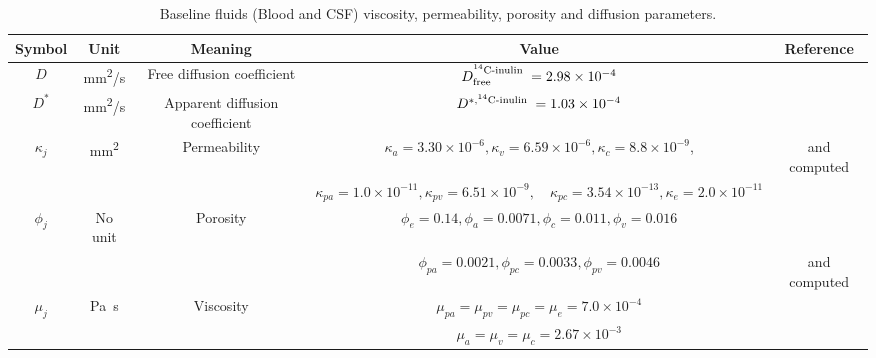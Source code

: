 \documentclass[a4paper,11pt]{article} %
\newcommand{\1}{^{(1)}}
\newcommand{\2}{^{(2)}}
\newcommand{\Cinulin}{$\prescript{14}{}{\text{C}}$-inulin }
\providecommand{\DIFdelbegin}{} %
\providecommand{\DIFaddendFL}{} %
\newcommand{\DIFscaledelfig}{0.5}
\newlength{\DIFdelgraphicswidth} %
\newlength{\DIFdelgraphicsheight} %
\newcommand{\DIFdelincludegraphics}[2][]{%
\sbox{\DIFdelgraphicsbox}{\DIFOincludegraphics[#1]{#2}}%
\settoboxwidth{\DIFdelgraphicswidth}{\DIFdelgraphicsbox} %
\settoboxtotalheight{\DIFdelgraphicsheight}{\DIFdelgraphicsbox} %
\scalebox{\DIFscaledelfig}{%
\parbox[b]{\DIFdelgraphicswidth}{\usebox{\DIFdelgraphicsbox}\\[-\baselineskip] \rule{\DIFdelgraphicswidth}{0em}}\llap{\resizebox{\DIFdelgraphicswidth}{\DIFdelgraphicsheight}{%
\setlength{\unitlength}{\DIFdelgraphicswidth}%
\begin{picture}(1,1)%
\thicklines\linethickness{2pt} %
{\color[rgb]{1,0,0}\put(0,0){\framebox(1,1){}}}%
{\color[rgb]{1,0,0}\put(0,0){\line( 1,1){1}}}%
{\color[rgb]{1,0,0}\put(0,1){\line(1,-1){1}}}%
\end{picture}%
}\hspace*{3pt}}} %
} %
\DeclareRobustCommand{\DIFdelbegin}{\DIFOdelbegin \let\includegraphics\DIFdelincludegraphics} %
\DeclareRobustCommand{\DIFaddendFL}{\DIFOaddendFL \let\includegraphics\DIFOincludegraphics} %
\begin{document}
\begin{table}[h]
{    \begin{tabular}{c|c|c|c|c}
          Symbol & Unit & Meaning & Value & Reference \\
         \hline 
         $D$ & \si{mm^2/\second} & Free diffusion coefficient & $ D_\text{free}^\text{\Cinulin} = 2.98 \times 10^{-4}$ & \cite{lanman1971diffusion} \\
         $ D^*$ & \si{mm^2/\second} & Apparent diffusion coefficient &  $D^{*,\text{\Cinulin}} = 1.03\times 10^{-4} $& \cite{lanman1971diffusion} \\
         $\kappa_{j}$ & \si{mm^2} & Permeability &  $\kappa_{a} = 3.30 \times 10^{-6}, \kappa_v = 6.59\times 10^{-6} , \kappa_{c}  =8.8\times 10^{-9}$, & \cite{Holter9894} and computed\\
    &&&$\kappa_{pa} =  1.0\times 10^{-11}, \kappa_{pv} = 6.51\times 10^{-9},\quad \kappa_{pc}  = 3.54 \times 10^{-13}, \kappa_e = 2.0\times 10^{-11} $ & \\
         $\phi_j$ & No unit & Porosity & $    \phi_e = 0.14, \phi_a = 0.0071,  \phi_c = 0.011, \phi_v = 0.016$ & \cite{Cserr-1991-Extracellular,Adriana-2007-MR,Lee-2001-CBV}\\ 
         &&& $\phi_{pa} = 0.0021,  \phi_{pc} = 0.0033, \phi_{pv} = 0.0046$ &  and computed\\
          $\mu_j$ & \si{\pascal  \second} & Viscosity & $\mu_{pa}=\mu_{pv}=\mu_{pc}=\mu_e=7.0\times 10^{-4} $   & \cite{bloomfield1998effects}\\
         & & &  $\mu_a=\mu_v= \mu_c = 2.67 \times 10^{-3}$ & \cite{tully_ventikos_2011}\\
    \end{tabular}}
    \DIFaddendFL \caption{Baseline fluids (Blood and CSF) viscosity, permeability, porosity and diffusion parameters.}
    \label{tab:fluid}
\end{table}

\DIFdelbegin %
\end{document}
